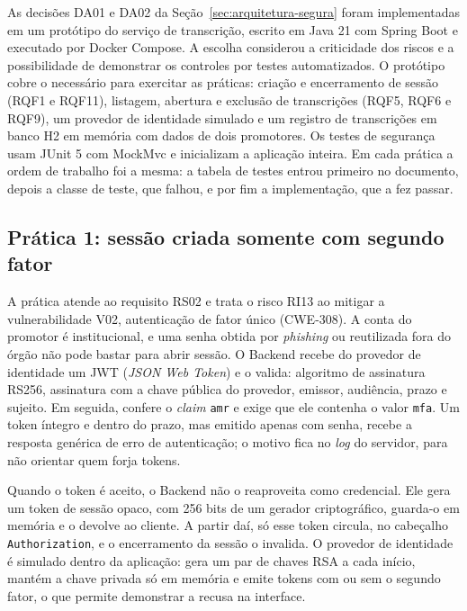 \documentclass[12pt]{article}
\begin{document}
    As decisões DA01 e DA02 da Seção~\ref{sec:arquitetura-segura} foram implementadas em um protótipo do serviço de transcrição, escrito em Java 21 com Spring Boot e executado por Docker Compose. A escolha considerou a criticidade dos riscos e a possibilidade de demonstrar os controles por testes automatizados.
    O protótipo cobre o necessário para exercitar as práticas: criação e encerramento de sessão (RQF1 e RQF11), listagem, abertura e exclusão de transcrições (RQF5, RQF6 e RQF9), um provedor de identidade simulado e um registro de transcrições em banco H2 em memória com dados de dois promotores.
    Os testes de segurança usam JUnit 5 com MockMvc e inicializam a aplicação inteira.
    Em cada prática a ordem de trabalho foi a mesma: a tabela de testes entrou primeiro no documento, depois a classe de teste, que falhou, e por fim a implementação, que a fez passar.

    \subsection{Prática 1: sessão criada somente com segundo fator}

    A prática atende ao requisito RS02 e trata o risco RI13 ao mitigar a vulnerabilidade V02, autenticação de fator único (CWE-308).
    A conta do promotor é institucional, e uma senha obtida por \textit{phishing} ou reutilizada fora do órgão não pode bastar para abrir sessão.
    O Backend recebe do provedor de identidade um JWT (\textit{JSON Web Token}) e o valida: algoritmo de assinatura RS256, assinatura com a chave pública do provedor, emissor, audiência, prazo e sujeito.
    Em seguida, confere o \textit{claim} \texttt{amr} \cite{rfc8176} e exige que ele contenha o valor \texttt{mfa}.
    Um token íntegro e dentro do prazo, mas emitido apenas com senha, recebe a resposta genérica de erro de autenticação; o motivo fica no \textit{log} do servidor, para não orientar quem forja tokens.

    Quando o token é aceito, o Backend não o reaproveita como credencial.
    Ele gera um token de sessão opaco, com 256 bits de um gerador criptográfico, guarda-o em memória e o devolve ao cliente.
    A partir daí, só esse token circula, no cabeçalho \texttt{Authorization}, e o encerramento da sessão o invalida.
    O provedor de identidade é simulado dentro da aplicação: gera um par de chaves RSA a cada início, mantém a chave privada só em memória e emite tokens com ou sem o segundo fator, o que permite demonstrar a recusa na interface.
\end{document}
